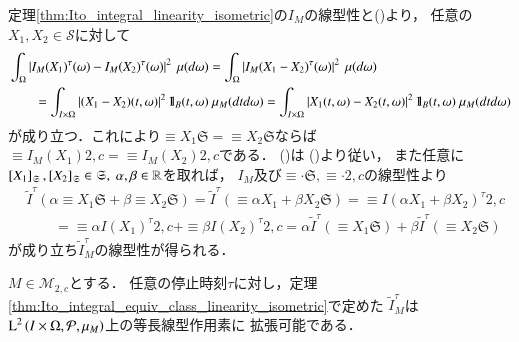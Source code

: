 	\begin{prf}
		定理\ref{thm:Ito_integral_linearity_isometric}の$I_M$の線型性と()より，
		任意の$X_1,X_2 \in \mathcal{S}$に対して
		\begin{align}
			&\int_\Omega \left| I_M(X_1)^\tau(\omega) - I_M(X_2)^\tau(\omega) \right|^2\ \mu(d\omega)
			= \int_\Omega \left| I_M(X_1 - X_2)^\tau(\omega) \right|^2\ \mu(d\omega) \\
			&\qquad = \int_{I \times \Omega} \left| (X_1 - X_2)(t,\omega) \right|^2 \defunc_B(t,\omega)\ \mu_M(dtd\omega)
			= \int_{I \times \Omega} \left| X_1(t,\omega) - X_2(t,\omega) \right|^2 \defunc_B(t,\omega)\ \mu_M(dtd\omega)
		\end{align}
		が成り立つ．これにより$\equiv{X_1}{\mathfrak{S}} = \equiv{X_2}{\mathfrak{S}}$ならば
		$\equiv{I_M(X_1)}{2,c} = \equiv{I_M(X_2)}{2,c}$である．
		()は
		()より従い，
		また任意に$\left[X_1\right]_{\mathfrak{S}},\left[X_2\right]_{\mathfrak{S}} \in \mathfrak{S},\ \alpha,\beta \in \mathbb{R}$を取れば，
		$I_M$及び$\equiv{\cdot}{\mathfrak{S}},\equiv{\cdot}{2,c}$の線型性より
		\begin{align}
			&\tilde{I}^\tau \left( \alpha \equiv{X_1}{\mathfrak{S}} + \beta \equiv{X_2}{\mathfrak{S}} \right)
			= \tilde{I}^\tau \left( \equiv{\alpha X_1 + \beta X_2}{\mathfrak{S}} \right)
			= \equiv{I(\alpha X_1 + \beta X_2)^\tau}{2,c} \\
			&\qquad = \equiv{\alpha I(X_1)^\tau}{2,c} + \equiv{\beta I(X_2)^\tau}{2,c}
			= \alpha \tilde{I}^\tau \left( \equiv{X_1}{\mathfrak{S}} \right) + \beta \tilde{I}^\tau \left( \equiv{X_2}{\mathfrak{S}} \right)
		\end{align}
		が成り立ち$\tilde{I}^\tau_M$の線型性が得られる．
		\QED
	\end{prf}
	
	\begin{screen}
		\begin{thm}[同値類に対する伊藤積分の拡張]
			$M \in \mathcal{M}_{2,c}$とする．
			任意の停止時刻$\tau$に対し，定理\ref{thm:Ito_integral_equiv_class_linearity_isometric}で定めた
			$\tilde{I}^\tau_M$は$\operatorname{L}^{2} \left(I \times \Omega,\mathcal{P},\mu_M\right)$上の等長線型作用素に
			拡張可能である．
			\label{thm:expansion_of_Ito_integral_equiv_class}
		\end{thm}
	\end{screen}
	
